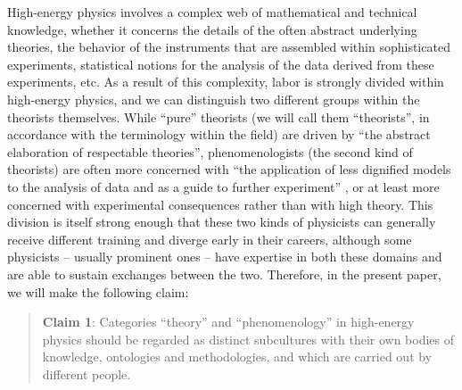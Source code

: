 \documentclass[smallextended]{svjour3}
\begin{document}
High-energy physics involves a complex web of mathematical and technical knowledge, whether it concerns the details of the often abstract underlying theories, the behavior of the instruments that are assembled within sophisticated experiments, statistical notions for the analysis of the data derived from these experiments, etc. As a result of this complexity, labor is strongly divided within high-energy physics, and we can distinguish two different groups within the theorists themselves.  While ``pure'' theorists (we will call them ``theorists'', in accordance with the terminology within the field) are driven by ``the abstract elaboration of respectable theories'', phenomenologists (the second kind of theorists) are often more concerned with ``the application of less dignified models to the analysis of data and as a
guide to further experiment'' \citep{pickering1984constructing}, or at least more concerned with experimental consequences rather than with high theory. This division is itself strong enough that these two kinds of physicists can generally receive different training and diverge early in their careers, although some physicists -- usually prominent ones -- have expertise in both these domains and are able to sustain exchanges between the two. Therefore, in the present paper, we will make the following claim:

\begin{quote}
    \textbf{Claim 1}: Categories ``theory'' and ``phenomenology'' in high-energy physics should be regarded as distinct subcultures with their own bodies of knowledge, ontologies and methodologies, and which are carried out by different people.
\end{quote}
\end{document}
